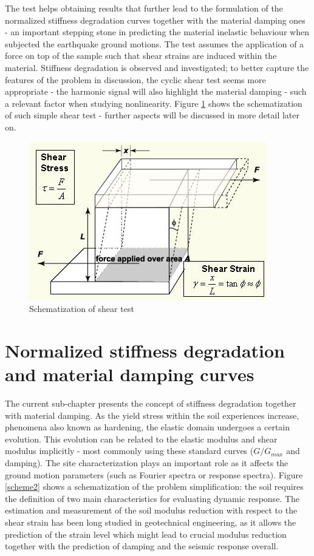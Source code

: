 \documentclass[10pt,a4paper]{report}
\begin{document}
The test helps obtaining results that further lead to the formulation of the normalized stiffness degradation curves together with the material damping ones - an important stepping stone in predicting the material inelastic behaviour when subjected the earthquake ground motions. The test assumes the application of a force on top of the sample such that shear strains are induced within the material. Stiffness degradation is observed and investigated; to better capture the features of the problem in discussion, the cyclic shear test seems more appropriate - the harmonic signal will also highlight the material damping - such a relevant factor when studying nonlinearity. Figure \ref{fig:shear} shows the schematization of such simple shear test - further aspects will be discussed in more detail later on.

\begin{figure}[h!]
	\centering
	\includegraphics[width=0.8\linewidth]{"shear_strain_detail"}
	\caption{Schematization of shear test}
	\label{fig:shear}
\end{figure}

\section{Normalized stiffness degradation and material damping curves}
The current sub-chapter presents the concept of stiffness degradation together with material damping. As the yield stress within the soil experiences increase, phenomena also known as hardening, the elastic domain undergoes a certain evolution. This evolution can be related to the elastic modulus and shear modulus implicitly - most commonly using these standard curves ($G/G_{max}$ and damping). The site characterization plays an important role as it affects the ground motion parameters (such as Fourier spectra or response spectra). Figure \ref{scheme2} shows a schematization of the problem simplification: the soil requires the definition of two main characteristics for evaluating dynamic response. The estimation and measurement of the soil modulus reduction with respect to the shear strain has been long studied in geotechnical engineering, as it allows the prediction of the strain level which might lead to crucial modulus reduction together with the prediction of damping and the seismic response overall. 
\end{document}
